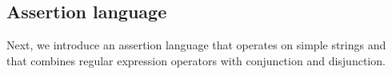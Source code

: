 \subsection{Assertion language}

%
%
%

Next, we introduce an assertion language that operates on simple strings
and that combines regular expression operators with conjunction and disjunction.


